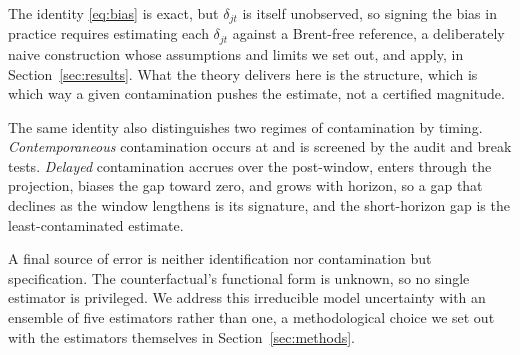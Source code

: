 The identity
\eqref{eq:bias} is exact, but $\delta_{jt}$ is itself unobserved, so signing the bias in
practice requires estimating each $\delta_{jt}$ against a Brent-free reference, a
deliberately naive construction whose assumptions and limits we set out, and apply, in
Section~\ref{sec:results}. What the theory delivers here is the structure, which
is which way a given contamination pushes the estimate, not a certified magnitude.

The same identity also distinguishes two regimes of contamination by timing.
\emph{Contemporaneous} contamination occurs at \T{} and is screened by the audit and
break tests. \emph{Delayed} contamination accrues over the post-window, enters through
the projection, biases the gap toward zero, and grows with horizon, so a gap that
declines as the window lengthens is its signature, and the short-horizon gap is
the least-contaminated estimate.

A final source of error is neither identification nor contamination but
specification. The counterfactual's functional form is unknown, so no single
estimator is privileged. We address this irreducible model uncertainty with an ensemble
of five estimators rather than one, a methodological choice we set out with the
estimators themselves in Section~\ref{sec:methods}.

